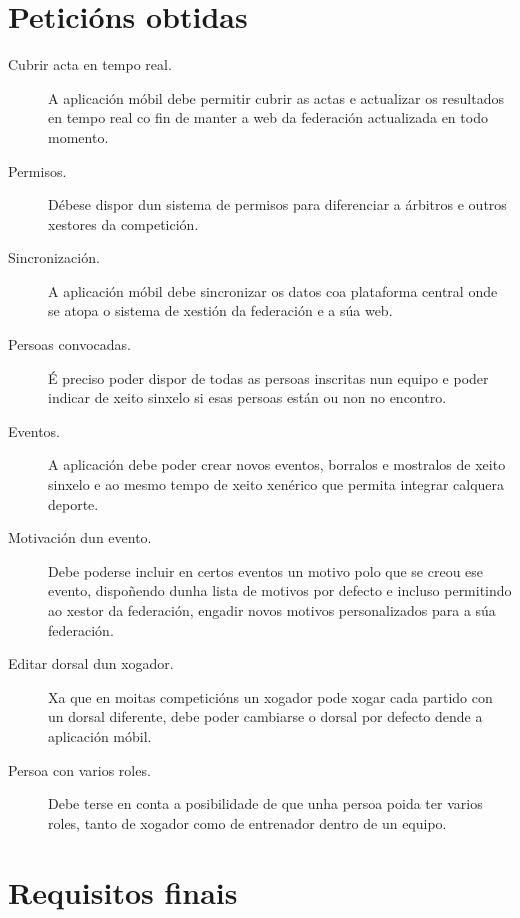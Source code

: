   \section{Peticións obtidas}
  \label{sec:analisis:obtido}
    \begin{description}
     \item [Cubrir acta en tempo real.] A aplicación móbil debe permitir cubrir 
as actas e actualizar os resultados en tempo real co fin de manter a web da 
federación actualizada en todo momento.

     \item [Permisos.] Débese dispor dun sistema de permisos para diferenciar a 
árbitros e outros xestores da competición.

     \item [Sincronización.] A aplicación móbil debe sincronizar os datos coa 
plataforma central onde se atopa o sistema de xestión da federación e a súa web.

     \item [Persoas convocadas.] É preciso poder dispor de todas as persoas 
inscritas nun equipo e poder indicar de xeito sinxelo si esas persoas están ou 
non no encontro.

     \item [Eventos.] A aplicación debe poder crear novos eventos, borralos e 
mostralos de xeito sinxelo e ao mesmo tempo de xeito xenérico que permita 
integrar calquera deporte.

     \item [Motivación dun evento.] Debe poderse incluir en certos eventos un 
motivo polo que se creou ese evento, dispoñendo dunha lista de motivos por 
defecto e incluso permitindo ao xestor da federación, engadir novos motivos 
personalizados para a súa federación.

     \item [Editar dorsal dun xogador.] Xa que en moitas competicións un 
xogador pode xogar cada partido con un dorsal diferente, debe poder cambiarse o 
dorsal por defecto dende a aplicación móbil.

     \item [Persoa con varios roles.] Debe terse en conta a posibilidade de que 
unha persoa poida ter varios roles, tanto de xogador como de entrenador dentro 
de un equipo.

    \end{description}

  \section{Requisitos finais}
  \label{sec:analisis:requisitos}
